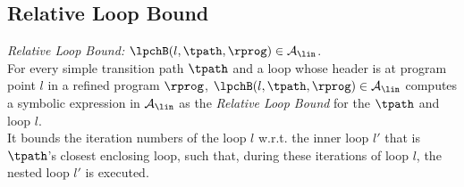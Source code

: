 \subsection{Relative Loop Bound}
\label{sec:}
%
\emph{Relative Loop Bound:} 
$\lpchB(l, \tpath, \rprog) \in \mathcal{A}_{\lin}$.
\\
For every simple transition path $\tpath$
and a loop whose header is at program point $l$ in a refined program $\rprog$,
 $\lpchB(l, \tpath, \rprog) \in \mathcal{A}_{\lin}$ computes a symbolic expression in $\mathcal{A}_{\lin}$
as the \emph{Relative Loop Bound} for the $\tpath$ and loop $l$.
\\
It bounds the iteration numbers of the loop $l$ w.r.t.
the inner loop $l'$ that is $\tpath$'s closest enclosing loop,
such that,
during these iterations of loop $l$, the nested loop $l'$ is executed.
